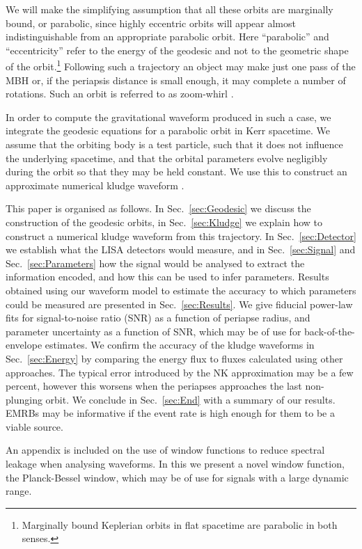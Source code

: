 \documentclass[useAMS,usedcolumn,usegraphicx,usenatbib]{mn2e}
\newcommand{\secref}[1]{Sec.~\ref{sec:#1}}
\begin{document}
We will make the simplifying assumption that all these orbits are marginally bound, or parabolic, since highly eccentric orbits will appear almost indistinguishable from an appropriate parabolic orbit. Here ``parabolic'' and ``eccentricity'' refer to the energy of the geodesic and not to the geometric shape of the orbit.\footnote{Marginally bound Keplerian orbits in flat spacetime are parabolic in both senses.} Following such a trajectory an object may make just one pass of the MBH or, if the periapsis distance is small enough, it may complete a number of rotations. Such an orbit is referred to as zoom-whirl \citep{Glampedakis2002a}.

In order to compute the gravitational waveform produced in such a case, we integrate the geodesic equations for a parabolic orbit in Kerr spacetime. We assume that the orbiting body is a test particle, such that it does not influence the underlying spacetime, and that the orbital parameters evolve negligibly during the orbit so that they may be held constant. We use this to construct an approximate numerical kludge waveform \citep{Babak2007}.

This paper is organised as follows. In \secref{Geodesic} we discuss the construction of the geodesic orbits, in \secref{Kludge} we explain how to construct a numerical kludge waveform from this trajectory. In \secref{Detector} we establish what the LISA detectors would measure, and in \secref{Signal} and \secref{Parameters} how the signal would be analysed to extract the information encoded, and how this can be used to infer parameters. Results obtained using our waveform model to estimate the accuracy to which parameters could be measured are presented in \secref{Results}. We give fiducial power-law fits for signal-to-noise ratio (SNR) as a function of periapse radius, and parameter uncertainty as a function of SNR, which may be of use for back-of-the-envelope estimates. We confirm the accuracy of the kludge waveforms in \secref{Energy} by comparing the energy flux to fluxes calculated using other approaches. The typical error introduced by the NK approximation may be a few percent, however this worsens when the periapses approaches the last non-plunging orbit. We conclude in \secref{End} with a summary of our results. EMRBs may be informative if the event rate is high enough for them to be a viable source.

An appendix is included on the use of window functions to reduce spectral leakage when analysing waveforms. In this we present a novel window function, the Planck-Bessel window, which may be of use for signals with a large dynamic range.
\end{document}
